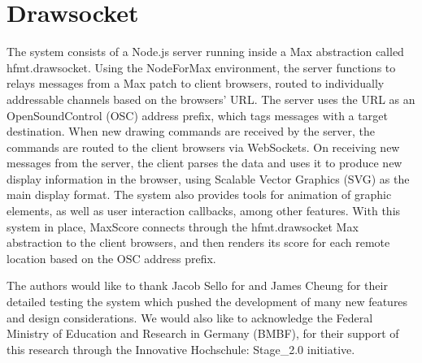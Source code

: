 \section{Drawsocket}
The \drawsocket system consists of a Node.js server running inside a Max abstraction called hfmt.drawsocket.
Using the NodeForMax environment, the server functions to relays messages from a Max patch to client browsers, routed to individually addressable channels based on the browsers' URL.
The server uses the URL as an OpenSoundControl (OSC) address prefix, which tags messages with a target destination.
When new drawing commands are received by the server, the commands are routed to the client browsers via WebSockets.
On receiving new messages from the server, the client parses the data and uses it to produce new display information in the browser, using Scalable Vector Graphics (SVG) as the main display format.
The system also provides tools for animation of graphic elements, as well as user interaction callbacks, among other features.
With this system in place, MaxScore connects through the hfmt.drawsocket Max abstraction to the client browsers, and then renders its score for each remote location based on the OSC address prefix.




\begin{acknowledgments}
The authors would like to thank Jacob Sello for and James Cheung for their detailed testing the system which pushed the development of many new features and design considerations. We would also like to acknowledge the Federal Ministry of Education and Research in Germany (BMBF), for their support of this research through the Innovative Hochschule: Stage\_2.0 initiative.
\end{acknowledgments} 

\balance






